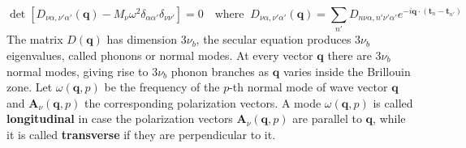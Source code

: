 \documentclass[10.75pt,a4paper,openright,bottom=2cm]{article}
\renewcommand{\Vec}[1]{\boldsymbol{#1}}
\begin{document}
\[
\det[D_{\nu\alpha,\nu'\alpha'}(\Vec{q})-M_\nu\omega^2\delta_{\alpha\alpha'}\delta_{\nu\nu'}]=0 \quad \text{where}\;\; D_{\nu\alpha,\nu'\alpha'}(\Vec{q})=\sum_{n'}D_{n\nu\alpha,n'\nu'\alpha'}e^{-i\Vec{q}\cdot(\Vec{t}_n-\Vec{t}_{n'})}
\]
The matrix $D(\Vec{q})$ has dimension $3\nu_b$, the secular equation produces $3\nu_b$ eigenvalues, called phonons or normal modes. At every vector $\Vec{q}$ there are $3\nu_b$ normal modes, giving rise to $3\nu_b$ phonon branches as $\Vec{q}$ varies inside the  Brillouin zone. Let $\omega(\Vec{q},p)$ be the frequency of the $p$-th normal mode of wave vector $\Vec{q}$ and $\Vec{A}_\nu(\Vec{q},p)$ the corresponding polarization vectors. A mode $\omega(\Vec{q},p)$ is called \textbf{longitudinal} in case the polarization vectors $\Vec{A}_\nu(\Vec{q},p)$ are parallel to $\Vec{q}$, while it is called \textbf{transverse} if they are perpendicular to it.
\newpage
\end{document}
